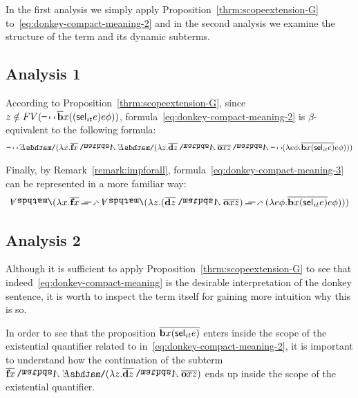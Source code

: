 In the first analysis we simply apply Proposition~\ref{thrm:scopeextension-G} to~\eqref{eq:donkey-compact-meaning-2} and in the second analysis we examine the structure of the term and its dynamic subterms. %

\subsection*{Analysis 1}


According to Proposition~\ref{thrm:scopeextension-G}, since $\z1 \notin FV(\n2 \tr{\cbeat}  \x1 (( \selK_{it} e ) e \phi))$, formula~\eqref{eq:donkey-compact-meaning-2} is $\beta$-equivalent to the following formula:
\begin{align}
\n2 \ex2 (\lambda \x1.  \tr{\cfarmer \x1} \cnj2   \ex2 (\lambda \z1.  \tr{\cdonkey \z1}\cnj2 \tr{\cown \x1 \z1}    \cnj2  \n2  ( \lambda e \phi. \tr{\cbeat \x1 ( \selK_{it} e )} e \phi ) )) \label{eq:donkey-compact-meaning-3}
\end{align}

Finally, by Remark~\eqref{remark:impforall}, formula~\eqref{eq:donkey-compact-meaning-3} can be represented in a more familiar way:
\begin{align}
 \all2 (\lambda \x1.  \tr{\cfarmer \x1} \impK2   \all2 (\lambda \z1. ( \tr{\cdonkey \z1}\cnj2 \tr{\cown \x1 \z1} )   \impK2    ( \lambda e \phi. \tr{\cbeat \x1 ( \selK_{it} e )} e \phi ) )) 
 \label{eq:donkey-compact-meaning-4}
\end{align}


\subsection*{Analysis 2}


Although it is sufficient to apply Proposition~\ref{thrm:scopeextension-G} to see that indeed~\eqref{eq:donkey-compact-meaning} is the desirable interpretation of the donkey sentence, it is worth to inspect the term itself for gaining more intuition why this is so.

In order to see that the proposition $\tr{\cbeat \x1 ( \selK_{it} e )}$ enters inside the scope of the existential quantifier related to  in~\eqref{eq:donkey-compact-meaning-2}, it is important to understand how the continuation of the subterm $\tr{\cfarmer \x1} \cnj2 \ex2 (\lambda \z1.  \tr{\cdonkey \z1}\cnj2 \tr{\cown \x1 \z1}  )$ ends up inside the scope of the existential quantifier. 

